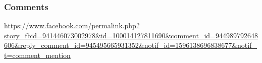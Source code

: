  
 
\subsubsection{Comments}

\url{https://www.facebook.com/permalink.php?story_fbid=941446073002978&id=100014127811690&comment_id=944989792648606&reply_comment_id=945495665931352&notif_id=1596138696838677&notif_t=comment_mention}

